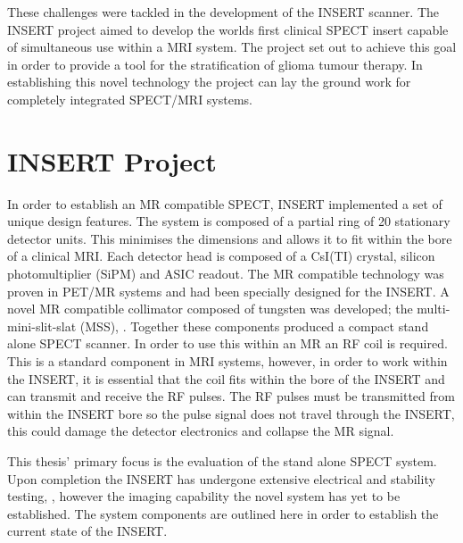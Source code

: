 These challenges were tackled in the development of the \acrshort{INSERT} scanner. The \acrshort{INSERT} project aimed to develop the worlds first clinical \acrshort{SPECT} insert capable of simultaneous use within a \acrshort{MRI} system. The project set out to achieve this goal in order to provide a tool for the stratification of glioma tumour therapy. In establishing this novel technology the project can lay the ground work for completely integrated \acrshort{SPECT/MRI} systems.

\section{INSERT Project}

In order to establish an \acrshort{MR} compatible \acrshort{SPECT}, \acrshort{INSERT} implemented a set of unique design features. The system is composed of a partial ring of 20 stationary detector units. This minimises the dimensions and allows it to fit within the bore of a clinical \acrshort{MRI}. Each detector head is composed of a CsI(TI) crystal, silicon photomultiplier (SiPM) and ASIC readout. The \acrshort{MR} compatible technology was proven in \acrshort{PET/MR} systems and had been specially designed for the \acrshort{INSERT}. A novel \acrshort{MR} compatible collimator composed of tungsten was developed; the multi-mini-slit-slat (MSS), \cite{7430894}. Together these components produced a compact stand alone \acrshort{SPECT} scanner. In order to use this within an \acrshort{MR} an \acrlong{RF} coil is required. This is a standard component in \acrshort{MRI} systems, however, in order to work within the \acrshort{INSERT}, it is essential that the coil fits within the bore of the \acrshort{INSERT} and can transmit and receive the \acrshort{RF} pulses. The \acrshort{RF} pulses must be transmitted from within the \acrshort{INSERT} bore so the pulse signal does not travel through the \acrshort{INSERT}, this could damage the detector electronics and collapse the \acrshort{MR} signal.

This thesis' primary focus is the evaluation of the stand alone \acrshort{SPECT} system. Upon completion the \acrshort{INSERT} has undergone extensive electrical and stability testing, \cite{8432104}, however the imaging capability the novel system has yet to be established. The system components are outlined here in order to establish the current state of the \acrshort{INSERT}.

